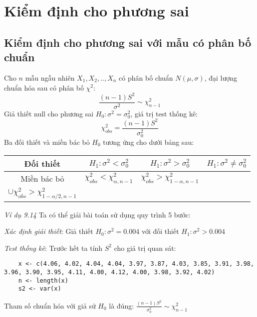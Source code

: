 \chapter{Kiểm định cho phương sai}

\section{Kiểm định cho phương sai với mẫu có phân bố chuẩn}

Cho $n$ mẫu ngẫu nhiên $X_1, X_2, .. , X_n$ có phân bố chuẩn $N(\mu, \sigma)$, 
đại lượng chuẩn hóa sau có phân bố $\chi^2$:
\begin{equation}
    \frac{(n - 1)S^2}{\sigma^2} \sim \chi^2_{n - 1}
\end{equation}
Giả thiết null cho phương sai $H_0: \sigma^2 = \sigma_0^2$, giá trị test thống kê:
$$\chi_{obs}^2 = \frac{(n - 1)S^2}{\sigma_0^2}$$
Ba đối thiết và miền bác bỏ $H_0$ tương ứng cho dưới bảng sau:
\begin{center}
    \begin{tabular}{| c | c | c | c |}
        \hline
        Đối thiết & $H_1: \sigma^2 < \sigma_0^2$ & $H_1: \sigma^2 > \sigma_0^2$ & $H_1: \sigma^2 \neq \sigma_0^2$ \\
        \hline
        Miền bác bỏ & $\chi_{obs}^2 < \chi_{\alpha, n - 1}^2$ & $\chi_{obs}^2 > \chi_{1 - \alpha, n - 1}^2$ & 
        \makecell{$\chi_{obs}^2 < \chi_{\alpha/2, n - 1}^2$ \\
        $\cup \chi_{obs}^2 > \chi_{1 - \alpha/2, n - 1}^2$} \\
        \hline
    \end{tabular}
\end{center}

\textit{Ví dụ 9.14} Ta có thể giải bài toán sử dụng quy trình 5 bước:

\textit{Xác định giải thiết}: Giả thiết $H_0: \sigma^2 = 0.004$ với đối thiết $H_1: \sigma^2 > 0.004$

\textit{Test thống kê}: 
Trước hết ta tính $S^2$ cho giá trị quan sát: 

\begin{lstlisting}
    x <- c(4.06, 4.02, 4.04, 4.04, 3.97, 3.87, 4.03, 3.85, 3.91, 3.98, 3.96, 3.90, 3.95, 4.11, 4.00, 4.12, 4.00, 3.98, 3.92, 4.02)
    n <- length(x)
    s2 <- var(x)
\end{lstlisting}

Tham số chuẩn hóa với giả sử $H_0$ là đúng: $\frac{(n - 1)S^2}{\sigma_0^2} \sim \chi_{n - 1}^2$

